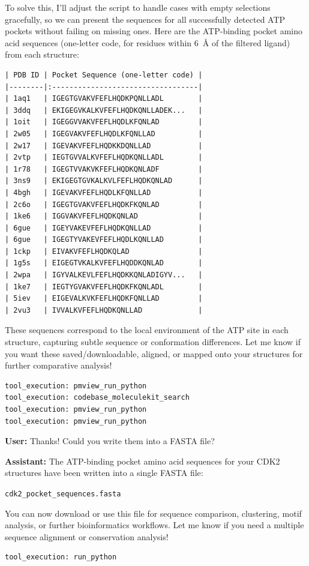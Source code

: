 \documentclass{article}
\begin{document}
\begin{assistantbox}
To solve this, I'll adjust the script to handle cases with empty selections gracefully, so we can present the sequences for all successfully detected ATP pockets without failing on missing ones. Here are the ATP-binding pocket amino acid sequences (one-letter code, for residues within 6~\AA{} of the filtered ligand) from each structure:
\begin{verbatim}
| PDB ID | Pocket Sequence (one-letter code) |
|--------|:----------------------------------|
| 1aq1   | IGEGTGVAKVFEFLHQDKPQNLLADL        |
| 3ddq   | EKIGEGVKALKVFEFLHQDKQNLLADEK...   |
| 1oit   | IGEGGVVAKVFEFLHQDLKFQNLAD         |
| 2w05   | IGEGVAKVFEFLHQDLKFQNLLAD          |
| 2w17   | IGEVAKVFEFLHQDKKDQNLLAD           |
| 2vtp   | IEGTGVVALKVFEFLHQDKQNLLADL        |
| 1r78   | IGEGTVVAKVKFEFLHQDKQNLADF         |
| 3ns9   | EKIGEGTGVKALKVLFEFLHQDKQNLAD      |
| 4bgh   | IGEVAKVFEFLHQDLKFQNLLAD           |
| 2c6o   | IGEGTGVAKVFEFLHQDKFKQNLAD         |
| 1ke6   | IGGVAKVFEFLHQDKQNLAD              |
| 6gue   | IGEYVAKEVFEFLHQDKQNLLAD           |
| 6gue   | IGEGTYVAKEVFEFLHQDLKQNLLAD        |
| 1ckp   | EIVAKVFEFLHQDKQLAD                |
| 1g5s   | EIGEGTVKALKVFEFLHQDDKQNLAD        |
| 2wpa   | IGYVALKEVLFEFLHQDKKQNLADIGYV...   |
| 1ke7   | IEGTYGVAKVFEFLHQDKFKQNLADL        |
| 5iev   | EIGEVALKVKFEFLHQDKFQNLLAD         |
| 2vu3   | IVVALKVFEFLHQDKQNLLAD             |
\end{verbatim}
These sequences correspond to the local environment of the ATP site in each structure, capturing subtle sequence or conformation differences.
Let me know if you want these saved/downloadable, aligned, or mapped onto your structures for further comparative analysis!
\begin{verbatim}
tool_execution: pmview_run_python
tool_execution: codebase_moleculekit_search
tool_execution: pmview_run_python
tool_execution: pmview_run_python
\end{verbatim}
\end{assistantbox}

\vspace{1.5em}

\begin{userbox}
\textbf{User:} Thanks! Could you write them into a FASTA file?
\end{userbox}

\begin{assistantbox}
\textbf{Assistant:} The ATP-binding pocket amino acid sequences for your CDK2 structures have been written into a single FASTA file:

\texttt{cdk2\_pocket\_sequences.fasta}

You can now download or use this file for sequence comparison, clustering, motif analysis, or further bioinformatics workflows. Let me know if you need a multiple sequence alignment or conservation analysis!
\begin{verbatim}
tool_execution: run_python
\end{verbatim}
\end{assistantbox}
\end{document}
